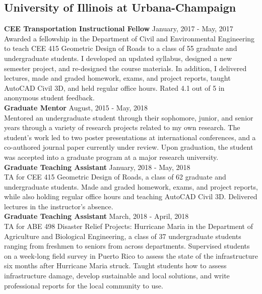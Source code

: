 \documentclass[12pt]{article}
\begin{document}
\subsection*{University of Illinois at Urbana-Champaign}
\textbf{CEE Transportation Instructional Fellow} \hfill January, 2017 - May, 2017 \\
Awarded a fellowship in the Department of Civil and Environmental Engineering to teach CEE 415 Geometric Design of Roads to a class of 55 graduate and undergraduate students. I developed an updated syllabus, designed a new semester project, and re-designed the course materials. In addition, I delivered lectures, made and graded homework, exams, and project reports, taught AutoCAD Civil 3D, and held regular office hours. Rated 4.1 out of 5 in anonymous student feedback. \\

\textbf{Graduate Mentor} \hfill August, 2015 - May, 2018 \\
Mentored an undergraduate student through their sophomore, junior, and senior years through a variety of research projects related to my own research. The student's work led to two poster presentations at international conferences, and a co-authored journal paper currently under review. Upon graduation, the student was accepted into a graduate program at a major research university. \\

\textbf{Graduate Teaching Assistant} \hfill January, 2018 - May, 2018 \\
TA for CEE 415 Geometric Design of Roads, a class of 62 graduate and undergraduate students. Made and graded homework, exams, and project reports, while also holding regular office hours and teaching AutoCAD Civil 3D. Delivered lectures in the instructor's absence. \\

\textbf{Graduate Teaching Assistant} \hfill March, 2018 - April, 2018 \\
TA for ABE 498 Disaster Relief Projects: Hurricane Maria in the Department of Agriculture and Biological Engineering, a class of 37 undergraduate students ranging from freshmen to seniors from across departments. Supervised students on a week-long field survey in Puerto Rico to assess the state of the infrastructure six months after Hurricane Maria struck. Taught students how to assess infrastructure damage, develop sustainable and local solutions, and write professional reports for the local community to use. \\
\end{document}
